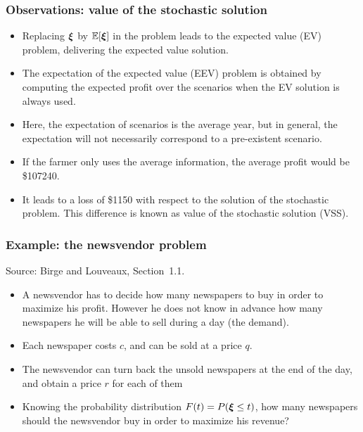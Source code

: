 \documentclass[aspectratio=169]{beamer}
\def\blue{\color{blue}}
\def\red{\color{red}}
\begin{document}
\begin{frame}
\frametitle{Observations: value of the stochastic solution}

\begin{itemize}
\item
Replacing ${\boldsymbol{\xi}}$ by ${\mathbb{E}}[{\boldsymbol{\xi}}]$ in the problem leads to the expected value (EV) problem, delivering the {\blue expected value solution}.
\item
The {\blue expectation of the expected value (EEV)} problem is obtained by computing the expected profit over the scenarios when the EV solution is always used.
\item
Here, the expectation of scenarios is the average year, but in general, the expectation will not necessarily correspond to a pre-existent scenario.
\item
If the farmer only uses the average information, the average profit would be \$107240.
\item
It leads to a loss of \$1150 with respect to the solution of the stochastic problem. This difference is known as {\red value of the stochastic solution (VSS)}.
\end{itemize}

\end{frame}


\begin{frame}
\frametitle{Example: the newsvendor problem}

Source: Birge and Louveaux, Section~1.1.

\mbox{}

\begin{itemize}
	\item
	A newsvendor has to decide how many newspapers to buy in order to maximize his profit.
	However he does not know in advance how many newspapers he will be able to sell during a day (the demand).
	\item
	Each newspaper costs $c$, and can be sold at a price $q$.
	\item
	The newsvendor can turn back the unsold newspapers at the end of the day, and obtain a price $r$ for each of them
	\item
	Knowing the probability distribution $F(t) = P({\boldsymbol{\xi}} \leq t)$, how many newspapers should the newsvendor buy in order to maximize his revenue?
\end{itemize}

\end{frame}
\end{document}
